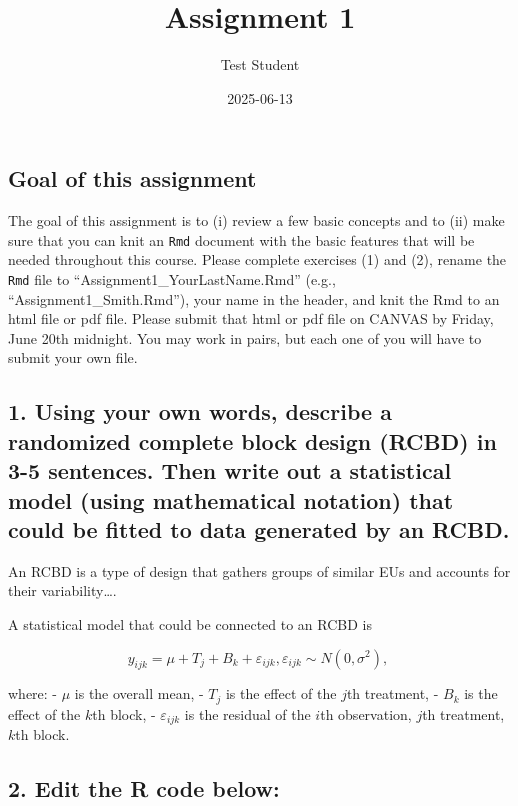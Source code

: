 \documentclass[
]{article}
\title{Assignment 1}
\author{Test Student}
\date{2025-06-13}
\begin{document}
\maketitle

\subsection{Goal of this assignment}\label{goal-of-this-assignment}

The goal of this assignment is to (i) review a few basic concepts and to
(ii) make sure that you can knit an \texttt{Rmd} document with the basic
features that will be needed throughout this course. Please complete
exercises (1) and (2), rename the \texttt{Rmd} file to
``Assignment1\_YourLastName.Rmd'' (e.g., ``Assignment1\_Smith.Rmd''),
your name in the header, and knit the Rmd to an html file or pdf file.
Please submit that html or pdf file on CANVAS by Friday, June 20th
midnight. You may work in pairs, but each one of you will have to submit
your own file.

\subsection{1. Using your own words, describe a randomized complete
block design (RCBD) in 3-5 sentences. Then write out a statistical model
(using mathematical notation) that could be fitted to data generated by
an
RCBD.}\label{using-your-own-words-describe-a-randomized-complete-block-design-rcbd-in-3-5-sentences.-then-write-out-a-statistical-model-using-mathematical-notation-that-could-be-fitted-to-data-generated-by-an-rcbd.}

An RCBD is a type of design that gathers groups of similar EUs and
accounts for their variability\ldots.

A statistical model that could be connected to an RCBD is

\[y_{ijk} = \mu + T_j + B_k + \varepsilon_{ijk}, \varepsilon_{ijk}\sim N(0, \sigma^2),\ \]

where: - \(\mu\) is the overall mean, - \(T_j\) is the effect of the
\(j\)th treatment, - \(B_k\) is the effect of the \(k\)th block, -
\(\varepsilon_{ijk}\) is the residual of the \(i\)th observation,
\(j\)th treatment, \(k\)th block.

\subsection{2. Edit the R code below:}\label{edit-the-r-code-below}
\end{document}
